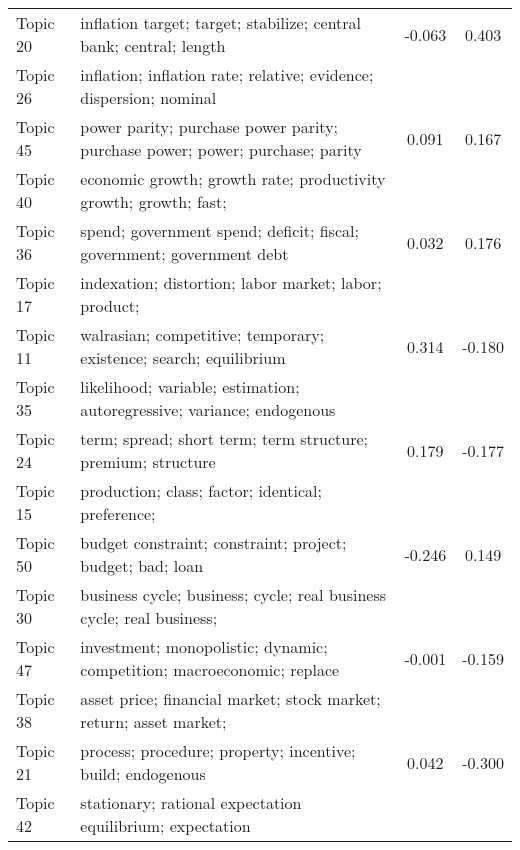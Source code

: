 \documentclass[
  12pt,
  onecolumn]{article}
\begin{document}
\begin{longtable}[t]{l>{\raggedright\arraybackslash}m{30em}cc}
Topic 20 & inflation
target;
target;
stabilize;
central
bank;
central;
length & -0.063 & 0.403\\
Topic 26 & inflation;
inflation
rate;
relative;
evidence;
dispersion;
nominal
\cellcolor{gray!6}{price} & \cellcolor{gray!6}{0.268} & \cellcolor{gray!6}{0.065}\\
Topic 45 & power
parity;
purchase
power
parity;
purchase
power;
power;
purchase;
parity & 0.091 & 0.167\\
Topic 40 & economic
growth;
growth
rate;
productivity
growth;
growth;
fast;
\cellcolor{gray!6}{region} & \cellcolor{gray!6}{0.198} & \cellcolor{gray!6}{0.058}\\
Topic 36 & spend;
government
spend;
deficit;
fiscal;
government;
government
debt & 0.032 & 0.176\\
\addlinespace
Topic 17 & indexation;
distortion;
labor
market;
labor;
product;
\cellcolor{gray!6}{corporate} & \cellcolor{gray!6}{-0.294} & \cellcolor{gray!6}{0.434}\\
Topic 11 & walrasian;
competitive;
temporary;
existence;
search;
equilibrium & 0.314 & -0.180\\
Topic 35 & likelihood;
variable;
estimation;
autoregressive;
variance;
endogenous
\cellcolor{gray!6}{variable} & \cellcolor{gray!6}{0.160} & \cellcolor{gray!6}{-0.127}\\
Topic 24 & term;
spread;
short
term;
term
structure;
premium;
structure & 0.179 & -0.177\\
Topic 15 & production;
class;
factor;
identical;
preference;
\cellcolor{gray!6}{input} & \cellcolor{gray!6}{0.121} & \cellcolor{gray!6}{-0.152}\\
\addlinespace
Topic 50 & budget
constraint;
constraint;
project;
budget;
bad;
loan & -0.246 & 0.149\\
Topic 30 & business
cycle;
business;
cycle;
real
business
cycle;
real
business;
\cellcolor{gray!6}{volatility} & \cellcolor{gray!6}{-0.112} & \cellcolor{gray!6}{-0.034}\\
Topic 47 & investment;
monopolistic;
dynamic;
competition;
macroeconomic;
replace & -0.001 & -0.159\\
Topic 38 & asset
price;
financial
market;
stock
market;
return;
asset
market;
\cellcolor{gray!6}{stock} & \cellcolor{gray!6}{-0.257} & \cellcolor{gray!6}{0.004}\\
Topic 21 & process;
procedure;
property;
incentive;
build;
endogenous & 0.042 & -0.300\\
\addlinespace
Topic 42 & stationary;
rational
expectation
equilibrium;
expectation

\end{longtable}
\end{document}
